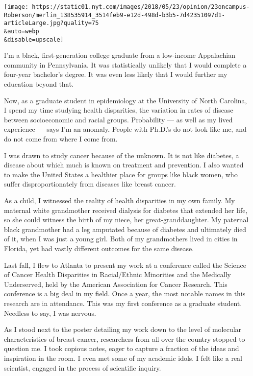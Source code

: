 \texttt{[image: https://static01.nyt.com/images/2018/05/23/opinion/23oncampus-Roberson/merlin\_138535914\_3514feb9-e12d-498d-b3b5-7d42351097d1-articleLarge.jpg?quality=75\\\&auto=webp\\\&disable=upscale]}

I'm a black, first-generation college graduate from a low-income
Appalachian community in Pennsylvania. It was statistically unlikely
that I would complete a four-year bachelor's degree. It was even less
likely that I would further my education beyond that.

Now, as a graduate student in epidemiology at the University of North
Carolina, I spend my time studying health disparities, the variation in
rates of disease between socioeconomic and racial groups. Probability
--- as well as my lived experience --- says I'm an anomaly. People with
Ph.D.'s do not look like me, and do not come from where I come from.

I was drawn to study cancer because of the unknown. It is not like
diabetes, a disease about which much is known on treatment and
prevention. I also wanted to make the United States a healthier place
for groups like black women, who suffer disproportionately from diseases
like breast cancer.

As a child, I witnessed the reality of health disparities in my own
family. My maternal white grandmother received dialysis for diabetes
that extended her life, so she could witness the birth of my niece, her
great-granddaughter. My paternal black grandmother had a leg amputated
because of diabetes and ultimately died of it, when I was just a young
girl. Both of my grandmothers lived in cities in Florida, yet had vastly
different outcomes for the same disease.

Last fall, I flew to Atlanta to present my work at a conference called
the Science of Cancer Health Disparities in Racial/Ethnic Minorities and
the Medically Underserved, held by the American Association for Cancer
Research. This conference is a big deal in my field. Once a year, the
most notable names in this research are in attendance. This was my first
conference as a graduate student. Needless to say, I was nervous.

As I stood next to the poster detailing my work down to the level of
molecular characteristics of breast cancer, researchers from all over
the country stopped to question me. I took copious notes, eager to
capture a fraction of the ideas and inspiration in the room. I even met
some of my academic idols. I felt like a real scientist, engaged in the
process of scientific inquiry.

